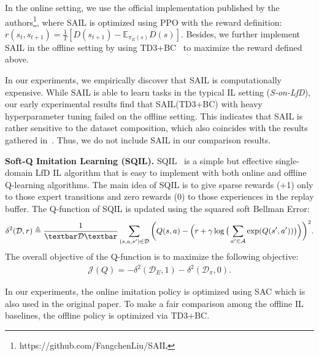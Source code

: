 In the online setting, we use the official implementation published by the authors\footnote{https://github.com/FangchenLiu/SAIL}, where SAIL is optimized using PPO with the reward definition: 
$r(s_t,s_{t+1})=\frac{1}{T} \left[ D(s_{t+1}) - \mathbb{E}_{\pi_{E}(s)}D(s)  \right]$. Besides, we further implement SAIL in the offline setting by using  TD3+BC~\cite{fujimoto2021minimalist} to maximize the reward defined above. 

In our experiments, we empirically discover that SAIL is computationally expensive. %
While SAIL is able to learn tasks in the typical IL setting (\textit{S-on-LfD}), our early experimental results find that SAIL(TD3+BC) with heavy hyperparameter tuning failed on the offline setting. This indicates that SAIL is rather sensitive to the dataset composition, which also coincides with the results gathered in~\citet{ma2022smodice}. Thus, we do not include SAIL in our comparison results. 

\textbf{Soft-Q Imitation Learning (SQIL).} 
SQIL~\citep{reddy2019sqil} is a simple but effective single-domain LfD IL algorithm that is easy to implement with both online and offline Q-learning algorithms. The main idea of SQIL is to give sparse rewards (+1) only to those expert transitions and zero rewards (0) to those experiences in the replay buffer. The Q-function of SQIL is updated using the squared soft Bellman Error:
\begin{align}
\delta^2( \mathcal{D}, r) \triangleq 
\frac{1}{\textbar \mathcal{D} \textbar} 
\sum_{(s,a,s')\in  \mathcal{D}}   \bigg( Q(s,a)  - \Big(r+\gamma \log\big(\sum_{a'\in \mathcal{A}} \exp(Q(s',a'))\big)\Big) \bigg)^2. \nonumber
\end{align}
The overall objective of the Q-function is to maximize the following objective:
\begin{align}
\mathcal{J}(Q)= -\delta^2(\mathcal{D}_E,1) - \delta^2(\mathcal{D}_\pi,0). \nonumber
\end{align}

In our experiments, the online imitation policy is optimized using SAC which is also used in the original paper. To make a fair comparison among the offline IL baselines, the offline policy is optimized via TD3+BC.

